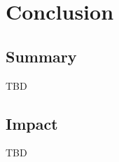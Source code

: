 
\chapter{Conclusion}
\label{chap:conc}

\section{Summary}
\label{sec:summary}


TBD


\section{Impact}
\label{sec:impact}

TBD


